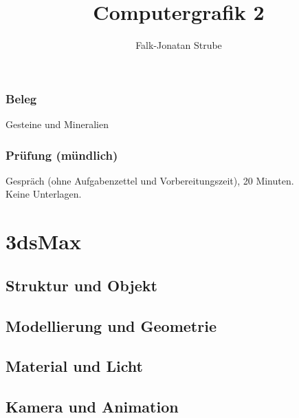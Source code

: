 \documentclass{scrreprt}
\title{Computergrafik 2}
\author{Falk-Jonatan Strube}
\begin{document}
\maketitle
\tableofcontents


\section*{Beleg}
Gesteine und Mineralien

\section*{Prüfung (mündlich)}
Gespräch (ohne Aufgabenzettel und Vorbereitungszeit), 20 Minuten.\\
Keine Unterlagen.

\part{3dsMax}

\chapter{Struktur und Objekt}


\chapter{Modellierung und Geometrie}


\chapter{Material und Licht}


\chapter{Kamera und Animation}


\end{document}
